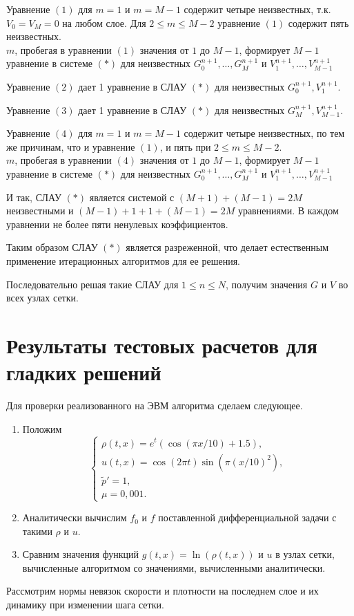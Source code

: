 \documentclass[a4paper, 11pt]{article}
\begin{document}
Уравнение $(1)$ для $m = 1$ и $m=M-1$ содержит четыре неизвестных, т.к. $V_0 = V_M = 0$ на любом слое. Для $2 \leqslant m \leqslant M - 2$ уравнение $(1)$ содержит пять неизвестных.\\ 
$m$, пробегая в уравнении $(1)$ значения от $1$ до $M - 1$, формирует $M-1$ уравнение в системе $(*)$ для неизвестных $G_0^{n+1}, \ldots , G_M^{n+1}$ и $V_1^{n+1}, \ldots , V_{M-1}^{n+1}$

Уравнение $(2)$ дает 1 уравнение в СЛАУ $(*)$ для неизвестных $G_0^{n+1}, V_1^{n+1}$.

Уравнение $(3)$ дает 1 уравнение в СЛАУ $(*)$ для неизвестных $G_M^{n+1}, V_{M-1}^{n+1}$.

Уравнение $(4)$ для $m =1$ и $m = M-1$ содержит четыре неизвестных, по тем же причинам, что и уравнение $(1)$, и пять при $2 \leqslant m \leqslant M - 2$.\\
$m$, пробегая в уравнении $(4)$ значения от $1$ до $M - 1$, формирует $M-1$ уравнение в системе $(*)$ для неизвестных $G_0^{n+1}, \ldots , G_M^{n+1}$ и $V_1^{n+1}, \ldots , V_{M-1}^{n+1}$

И так, СЛАУ $(*)$ является системой с $(M+1) + (M-1) = 2M$ неизвестными и $(M-1) + 1 + 1 + (M-1) = 2M$ уравнениями. В каждом уравнении не более пяти ненулевых коэффициентов.

Таким образом СЛАУ $(*)$ является разреженной, что делает естественным применение итерационных алгоритмов для ее решения.

Последовательно решая такие СЛАУ для $1 \leqslant n \leqslant N$, получим значения $G$ и $V$ во всех узлах сетки.

\section{Результаты тестовых расчетов для гладких решений}
Для проверки реализованного на ЭВМ алгоритма сделаем следующее.
\begin{enumerate}
\item Положим 
$$
\begin{cases}
\rho (t, x) = e^t (\cos (\pi x / 10) + 1.5), \\
u (t, x) = \cos (2 \pi t) \sin (\pi (x/10)^2), \\
\tilde{p}' = 1, \\
\mu =  0,001.
\end{cases}
$$
\item Аналитически вычислим $f_0$ и $f$ поставленной дифференциальной задачи с такими $\rho$ и $u$.
\item Сравним значения функций $g (t, x) = \ln (\rho (t, x))$ и $u$ в узлах сетки, вычисленные алгоритмом со значениями, вычисленными аналитически.
\end{enumerate}
Рассмотрим нормы невязок скорости и плотности на последнем слое и их динамику при изменении шага сетки.
\enlargethispage{5\baselineskip}\\
\end{document}
